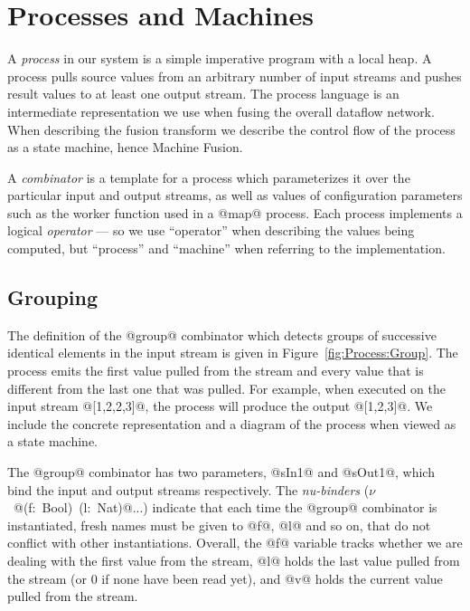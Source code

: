 
\section{Processes and Machines}
\label{s:Processes}

A \emph{process} in our system is a simple imperative program with a local heap. A process pulls source values from an arbitrary number of input streams and pushes result values to at least one output stream. The process language is an intermediate representation we use when fusing the overall dataflow network. When describing the fusion transform we describe the control flow of the process as a state machine, hence Machine Fusion. 

A \emph{combinator} is a template for a process which parameterizes it over the particular input and output streams, as well as values of configuration parameters such as the worker function used in a @map@ process. Each process implements a logical \emph{operator} --- so we use ``operator'' when describing the values being computed, but ``process'' and ``machine'' when referring to the implementation. 


\subsection{Grouping}

The definition of the @group@ combinator which detects groups of successive identical elements in the input stream is given in Figure~\ref{fig:Process:Group}. The process emits the first value pulled from the stream and every value that is different from the last one that was pulled. For example, when executed on the input stream @[1,2,2,3]@, the process will produce the output @[1,2,3]@. We include the concrete representation and a diagram of the process when viewed as a state machine.

The @group@ combinator has two parameters, @sIn1@ and @sOut1@, which bind the input and output streams respectively. The \emph{nu-binders} \mbox{($\nu$ @(f: Bool) (l: Nat)@...)} indicate that each time the @group@ combinator is instantiated, fresh names must be given to @f@, @l@ and so on, that do not conflict with other instantiations. Overall, the @f@ variable tracks whether we are dealing with the first value from the stream, @l@ holds the last value pulled from the stream (or 0 if none have been read yet), and @v@ holds the current value pulled from the stream. 

